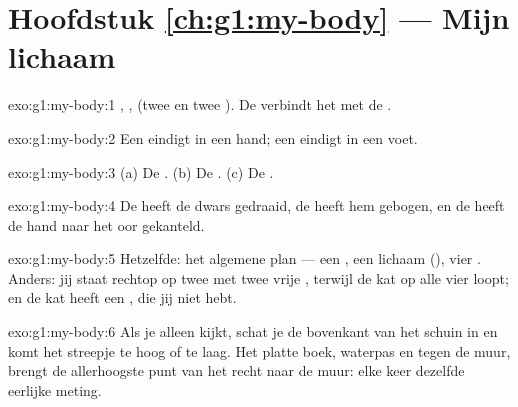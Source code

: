 \section*{Hoofdstuk \ref{ch:g1:my-body} --- Mijn lichaam}

\begin{solution}{exo:g1:my-body:1}
, ,  (twee  en twee ). De  verbindt het
 met de .
\end{solution}

\begin{solution}{exo:g1:my-body:2}
Een  eindigt in een hand; een  eindigt in een voet.
\end{solution}

\begin{solution}{exo:g1:my-body:3}
(a) De . (b) De . (c) De .
\end{solution}

\begin{solution}{exo:g1:my-body:4}
De  heeft de  dwars gedraaid, de  heeft hem gebogen,
en de  heeft de hand naar het oor gekanteld.
\end{solution}

\begin{solution}{exo:g1:my-body:5}
Hetzelfde: het algemene plan --- een , een lichaam (), vier
. Anders: jij staat rechtop op twee  met twee vrije
, terwijl de kat op alle vier loopt; en de kat heeft een ,
die jij niet hebt.
\end{solution}

\begin{solution}{exo:g1:my-body:6}
Als je alleen kijkt, schat je de bovenkant van het  schuin in en
komt het streepje te hoog of te laag. Het platte boek, waterpas en
tegen de muur, brengt de allerhoogste punt van het  recht naar de
muur: elke keer dezelfde eerlijke meting.
\end{solution}

